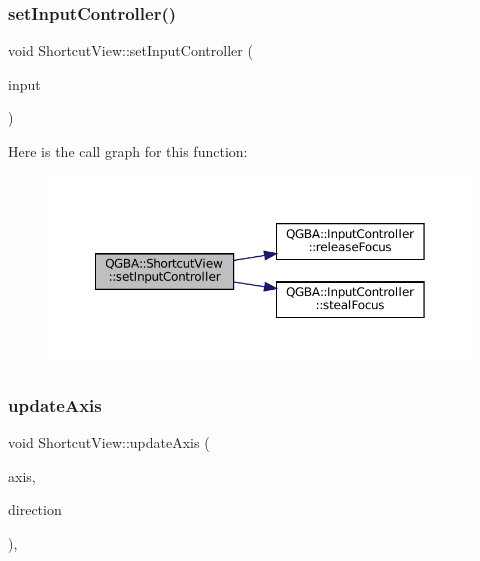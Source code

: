 \mbox{\label{class_q_g_b_a_1_1_shortcut_view_a66fea4a2af2c2f1aac50b5a29d931fb1}} 
\subsubsection{\texorpdfstring{set\+Input\+Controller()}{setInputController()}}
{\footnotesize\ttfamily void Shortcut\+View\+::set\+Input\+Controller (\begin{DoxyParamCaption}\item[{\mbox{\hyperlink{class_q_g_b_a_1_1_input_controller}{Input\+Controller}} $\ast$}]{input }\end{DoxyParamCaption})}

Here is the call graph for this function\+:
\nopagebreak
\begin{figure}[H]
\begin{center}
\leavevmode
\includegraphics[width=350pt]{class_q_g_b_a_1_1_shortcut_view_a66fea4a2af2c2f1aac50b5a29d931fb1_cgraph}
\end{center}
\end{figure}
\mbox{\label{class_q_g_b_a_1_1_shortcut_view_a9d355b52b56584c687dd678031a41d97}} 
\subsubsection{\texorpdfstring{update\+Axis}{updateAxis}}
{\footnotesize\ttfamily void Shortcut\+View\+::update\+Axis (\begin{DoxyParamCaption}\item[{\mbox{\hyperlink{ioapi_8h_a787fa3cf048117ba7123753c1e74fcd6}{int}}}]{axis,  }\item[{\mbox{\hyperlink{ioapi_8h_a787fa3cf048117ba7123753c1e74fcd6}{int}}}]{direction }\end{DoxyParamCaption})\hspace{0.3cm}{\ttfamily [private]}, {\ttfamily [slot]}}

